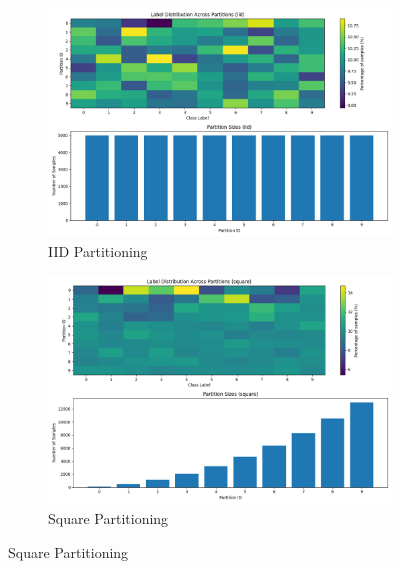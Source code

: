 \documentclass[11pt]{article}
\begin{document}
    \begin{figure}[h]
        \centering

        \begin{subfigure}[b]{0.45\textwidth}
            \centering
            \includegraphics[width=\textwidth]{img/partitions/partition_distribution_iid}
            \caption{IID Partitioning}
            \label{fig:iid_partitioning}
        \end{subfigure}
        \hfill
        \begin{subfigure}[b]{0.45\textwidth}
            \centering
            \includegraphics[width=\textwidth]{img/partitions/partition_distribution_square}
            \caption{Square Partitioning}
            \label{fig:square_partitioning}
        \end{subfigure}

        \vspace{0.5cm}


\end{figure}
\end{document}

